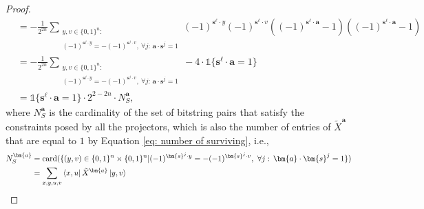 \documentclass[a4paper,onecolumn,notitlepage,nofootinbib,longbibliography,superscriptaddress, floatfix, pra, aps, 10pt]{revtex4-2}
\newcommand{\vta}{{\bm{a}}}
\newcommand{\vtsl}{{\bm{s}^\ell}}
\newcommand{\vts}{{\bm{s}}}
\begin{document}
\begin{proof}
\begin{align}
    &= - \frac{1}{2^{2n}} \sum_{\substack{y,v \in \{0,1\}^n:\\ (-1)^{\vts^j \cdot y} = -(-1)^{\vts^j \cdot v},\ \forall j:\,\vta\cdot\vts^j=1}}  (-1)^{\vtsl \cdot y} (-1)^{\vtsl \cdot v}\left((-1)^{\vtsl \cdot \vta} - 1 \right)  \left((-1)^{\vtsl \cdot \vta} - 1 \right) \\
    &= - \frac{1}{2^{2n}} \sum_{\substack{y,v \in \{0,1\}^n:\\ (-1)^{\vts^j \cdot y} = -(-1)^{\vts^j \cdot v},\ \forall j:\,\vta\cdot\vts^j=1}} -4 \cdot \mathds{1}\{\vtsl \cdot \vta=1\} \\
    &= \mathds{1}\{\vtsl \cdot \vta=1\} \cdot 2^{2-2n} \cdot N_S^\vta,
\end{align}
where $N_S^\vta$ is the cardinality of the set of bitstring pairs that satisfy the constraints posed by all the projectors, which is also the number of entries of $\tilde{X}^\vta$ that are equal to $1$ by Equation \ref{eq: number of surviving}, i.e.,
\begin{align}
    N_S^\vta &= \text{card}(\{(y,v)\in \{0,1\}^n \times \{0,1\}^n \vert (-1)^{\vts^j \cdot y} = -(-1)^{\vts^j \cdot v},\ \forall j:\,\vta\cdot\vts^j=1\}) \label{eq: system of linear equations} \\
    &=\sum_{x,y,u,v}\bra{x,u}\tilde{X}^\vta\ket{y,v}
\end{align}
\end{proof}
\end{document}

